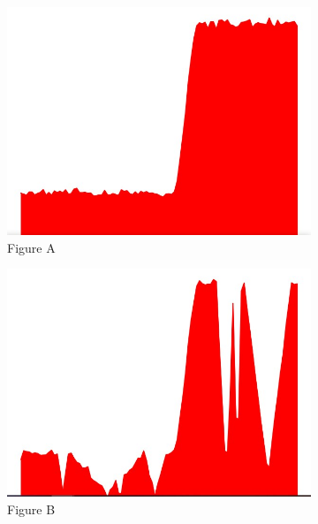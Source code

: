 \documentclass[french]{article}
\theoremstyle{mytheoremstyle}
\theoremstyle{mytheoremstyle}
\theoremstyle{myproblemstyle}
\begin{document}
\begin{figure}[H]
    \centering
    \begin{subfigure}[t]{0.3\textwidth}
            \centering
            \includegraphics[width=1\linewidth]{images/od_stable.jpg}
            \caption{Figure A}
    \end{subfigure}%
    \begin{subfigure}[t]{0.3\textwidth}
            \centering
            \includegraphics[width=1\linewidth]{images/od_malfunction.jpg}
            \caption{Figure B}
    \end{subfigure}
    \begin{subfigure}[t]{0.3\textwidth}
            \centering

\end{subfigure}
\end{figure}
\end{document}
